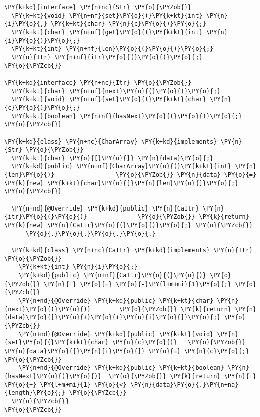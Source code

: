 \begin{Verbatim}[commandchars=\\\{\}]
\PY{k+kd}{interface} \PY{n+nc}{Str} \PY{o}{\PYZob{}}
  \PY{k+kt}{void} \PY{n+nf}{set}\PY{o}{(}\PY{k+kt}{int} \PY{n}{i}\PY{o}{,} \PY{k+kt}{char} \PY{n}{c}\PY{o}{)}\PY{o}{;}
  \PY{k+kt}{char} \PY{n+nf}{get}\PY{o}{(}\PY{k+kt}{int} \PY{n}{i}\PY{o}{)}\PY{o}{;}
  \PY{k+kt}{int} \PY{n+nf}{len}\PY{o}{(}\PY{o}{)}\PY{o}{;}
  \PY{n}{Itr} \PY{n+nf}{itr}\PY{o}{(}\PY{o}{)}\PY{o}{;}
\PY{o}{\PYZcb{}}

\PY{k+kd}{interface} \PY{n+nc}{Itr} \PY{o}{\PYZob{}}
  \PY{k+kt}{char} \PY{n+nf}{next}\PY{o}{(}\PY{o}{)}\PY{o}{;}
  \PY{k+kt}{void} \PY{n+nf}{set}\PY{o}{(}\PY{k+kt}{char} \PY{n}{c}\PY{o}{)}\PY{o}{;} 
  \PY{k+kt}{boolean} \PY{n+nf}{hasNext}\PY{o}{(}\PY{o}{)}\PY{o}{;}
\PY{o}{\PYZcb{}}

\PY{k+kd}{class} \PY{n+nc}{CharArray} \PY{k+kd}{implements} \PY{n}{Str} \PY{o}{\PYZob{}}
  \PY{k+kt}{char} \PY{o}{[}\PY{o}{]} \PY{n}{data}\PY{o}{;}
  \PY{k+kd}{public} \PY{n+nf}{CharArray}\PY{o}{(}\PY{k+kt}{int} \PY{n}{len}\PY{o}{)}                 \PY{o}{\PYZob{}} \PY{n}{data} \PY{o}{=} \PY{k}{new} \PY{k+kt}{char}\PY{o}{[}\PY{n}{len}\PY{o}{]}\PY{o}{;} \PY{o}{\PYZcb{}}

  \PY{n+nd}{@Override} \PY{k+kd}{public} \PY{n}{CaItr} \PY{n}{itr}\PY{o}{(}\PY{o}{)}              \PY{o}{\PYZob{}} \PY{k}{return} \PY{k}{new} \PY{n}{CaItr}\PY{o}{(}\PY{o}{)}\PY{o}{;} \PY{o}{\PYZcb{}}
      \PY{o}{.}\PY{o}{.}\PY{o}{.}\PY{o}{.}

  \PY{k+kd}{class} \PY{n+nc}{CaItr} \PY{k+kd}{implements} \PY{n}{Itr} \PY{o}{\PYZob{}}
    \PY{k+kt}{int} \PY{n}{i}\PY{o}{;}
    \PY{k+kd}{public} \PY{n+nf}{CaItr}\PY{o}{(}\PY{o}{)} \PY{o}{\PYZob{}} \PY{n}{i} \PY{o}{=} \PY{o}{-}\PY{l+m+mi}{1}\PY{o}{;} \PY{o}{\PYZcb{}}
    \PY{n+nd}{@Override} \PY{k+kd}{public} \PY{k+kt}{char} \PY{n}{next}\PY{o}{(}\PY{o}{)}        \PY{o}{\PYZob{}} \PY{k}{return} \PY{n}{data}\PY{o}{[}\PY{o}{+}\PY{o}{+}\PY{n}{i}\PY{o}{]}\PY{o}{;} \PY{o}{\PYZcb{}}
    \PY{n+nd}{@Override} \PY{k+kd}{public} \PY{k+kt}{void} \PY{n}{set}\PY{o}{(}\PY{k+kt}{char} \PY{n}{c}\PY{o}{)}   \PY{o}{\PYZob{}} \PY{n}{data}\PY{o}{[}\PY{n}{i}\PY{o}{]} \PY{o}{=} \PY{n}{c}\PY{o}{;} \PY{o}{\PYZcb{}}
    \PY{n+nd}{@Override} \PY{k+kd}{public} \PY{k+kt}{boolean} \PY{n}{hasNext}\PY{o}{(}\PY{o}{)}  \PY{o}{\PYZob{}} \PY{k}{return} \PY{n}{i} \PY{o}{+} \PY{l+m+mi}{1} \PY{o}{<} \PY{n}{data}\PY{o}{.}\PY{n+na}{length}\PY{o}{;} \PY{o}{\PYZcb{}}
  \PY{o}{\PYZcb{}}
\PY{o}{\PYZcb{}}


\end{Verbatim}
